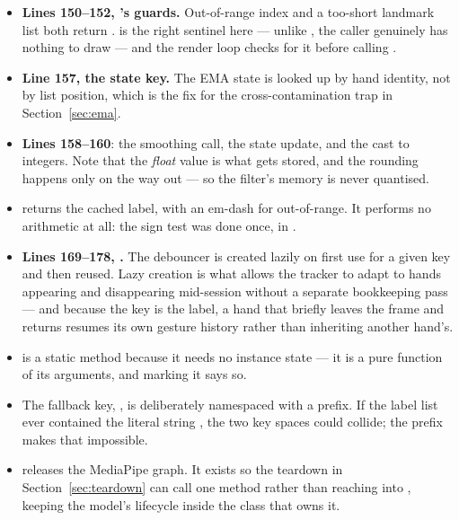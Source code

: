\begin{itemize}
  \item \textbf{Lines 150--152, 's guards.} Out-of-range index and a too-short
        landmark list both return .  is the right sentinel here --- unlike
        , the caller genuinely has nothing to draw --- and the render loop
        checks for it before calling .
  \item \textbf{Line 157, the state key.} The EMA state is looked up by hand identity, not by list
        position, which is the fix for the cross-contamination trap in Section~\ref{sec:ema}.
  \item \textbf{Lines 158--160}: the smoothing call, the state update, and the cast to integers. Note
        that the \emph{float} value is what gets stored, and the rounding happens only on the way out
        --- so the filter's memory is never quantised.
  \item \textbf{} returns the cached label, with an em-dash for out-of-range. It
        performs no arithmetic at all: the sign test was done once, in .
  \item \textbf{Lines 169--178, .} The debouncer is created lazily on first use for a
        given key and then reused. Lazy creation is what allows the tracker to adapt to hands
        appearing and disappearing mid-session without a separate bookkeeping pass --- and because
        the key is the label, a hand that briefly leaves the frame and returns resumes its own
        gesture history rather than inheriting another hand's.
\end{itemize}

\begin{codecard}

\end{codecard}

\begin{itemize}
  \item \textbf{} is a static method because it needs no instance state --- it is
        a pure function of its arguments, and marking it  says so.
  \item The fallback key, , is deliberately namespaced with a prefix.
        If the label list ever contained the literal string , the two key spaces could
        collide; the prefix makes that impossible.
  \item \textbf{} releases the MediaPipe graph. It exists so the teardown in
        Section~\ref{sec:teardown} can call one method rather than reaching into
        , keeping the model's lifecycle inside the class that owns it.
\end{itemize}

